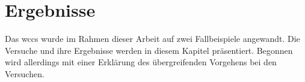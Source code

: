 \chapter{Ergebnisse}
    \label{chapter:Findings}
    Das \gls{wccs} wurde im Rahmen dieser Arbeit auf zwei Fallbeispiele angewandt.
    Die Versuche und ihre Ergebnisse werden in diesem Kapitel präsentiert.
    Begonnen wird allerdings mit einer Erklärung des übergreifenden Vorgehens bei den Versuchen.
   
    
    
    
